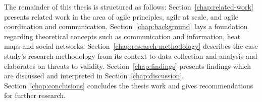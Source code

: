 The remainder of this thesis is structured as follows: Section~\ref{chap:related-work} presents related work in the area of agile principles, agile at scale, and agile coordination and communication. Section~\ref{chap:background} lays a foundation regarding theoretical concepts such as communication and information, heat maps and social networks. Section~\ref{chap:research-methodology} describes the case study's research methodology from its context to data collection and analysis and elaborates on threats to validity. Section~\ref{chap:findings} presents findings which are discussed and interpreted in Section~\ref{chap:discussion}. Section~\ref{chap:conclusions} concludes the thesis work and gives recommendations for further research.
